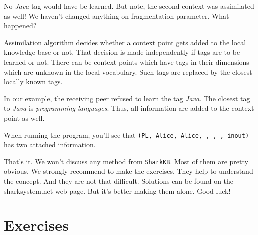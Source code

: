No {\it Java} tag would have be learned. But note, the second context was assimilated as well! We haven't changed anything on fragmentation parameter. What happened?

Assimilation algorithm decides whether a context point gets added to the local knowledge base or not. That decision is made independently if tags are to be learned or not. There can be context points which have tags in their dimensions which are unknown in the local vocabulary. Such tags are replaced by the closest locally known tags.

In our example, the receiving peer refused to learn the tag {\it Java}. The closest tag to {\it Java} is {\it programming languages}. Thus, all information are added to the context point as well.

When running the program, you'll see that {\tt (PL, Alice, Alice,-,-,-, inout)}
has two attached information.

That's it. We won't discuss any method from {\tt SharkKB}. Most of them are pretty obvious. We strongly recommend to make the exercises. They help to understand the concept. And they are not that difficult. Solutions can be found on the sharksystem.net web page. But it's better making them alone. Good luck!

\section{Exercises}
